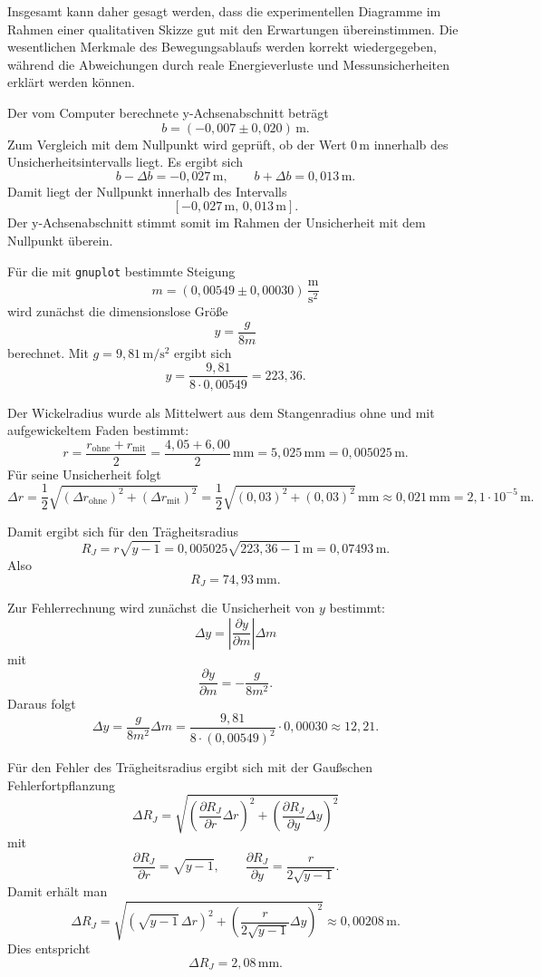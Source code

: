 \documentclass{report}
\begin{document}
\noindent
Insgesamt kann daher gesagt werden, dass die experimentellen Diagramme im Rahmen einer qualitativen Skizze gut mit den Erwartungen übereinstimmen. Die wesentlichen Merkmale des Bewegungsablaufs werden korrekt wiedergegeben, während die Abweichungen durch reale Energieverluste und Messunsicherheiten erklärt werden können.

\bigskip

\noindent
Der vom Computer berechnete y-Achsenabschnitt beträgt
\[
b = (-0{,}007 \pm 0{,}020)\,\mathrm{m}.
\]
Zum Vergleich mit dem Nullpunkt wird geprüft, ob der Wert \(0\,\mathrm{m}\) innerhalb des Unsicherheitsintervalls liegt. Es ergibt sich
\[
b-\Delta b = -0{,}027\,\mathrm{m},
\qquad
b+\Delta b = 0{,}013\,\mathrm{m}.
\]
Damit liegt der Nullpunkt innerhalb des Intervalls
\[
[-0{,}027\,\mathrm{m},\,0{,}013\,\mathrm{m}].
\]
Der y-Achsenabschnitt stimmt somit im Rahmen der Unsicherheit mit dem Nullpunkt überein.


\bigskip

\noindent
Für die mit \texttt{gnuplot} bestimmte Steigung
\[
m=(0{,}00549\pm0{,}00030)\,\mathrm{\frac{m}{s^2}}
\]
wird zunächst die dimensionslose Größe
\[
y=\frac{g}{8m}
\]
berechnet. Mit \(g=9{,}81\,\mathrm{m/s^2}\) ergibt sich
\[
y=\frac{9{,}81}{8\cdot0{,}00549}=223{,}36.
\]

\noindent
Der Wickelradius wurde als Mittelwert aus dem Stangenradius ohne und mit aufgewickeltem Faden bestimmt:
\[
r=\frac{r_{\text{ohne}}+r_{\text{mit}}}{2}
=\frac{4{,}05+6{,}00}{2}\,\mathrm{mm}
=5{,}025\,\mathrm{mm}
=0{,}005025\,\mathrm{m}.
\]
Für seine Unsicherheit folgt
\[
\Delta r=\frac12\sqrt{(\Delta r_{\text{ohne}})^2+(\Delta r_{\text{mit}})^2}
=\frac12\sqrt{(0{,}03)^2+(0{,}03)^2}\,\mathrm{mm}
\approx0{,}021\,\mathrm{mm}
=2{,}1\cdot10^{-5}\,\mathrm{m}.
\]

\noindent
Damit ergibt sich für den Trägheitsradius
\[
R_J=r\sqrt{y-1}
=0{,}005025\sqrt{223{,}36-1}\,\mathrm{m}
=0{,}07493\,\mathrm{m}.
\]
Also
\[
R_J=74{,}93\,\mathrm{mm}.
\]

\noindent
Zur Fehlerrechnung wird zunächst die Unsicherheit von \(y\) bestimmt:
\[
\Delta y=\left|\frac{\partial y}{\partial m}\right|\Delta m
\]
mit
\[
\frac{\partial y}{\partial m}=-\frac{g}{8m^2}.
\]
Daraus folgt
\[
\Delta y=\frac{g}{8m^2}\Delta m
=\frac{9{,}81}{8\cdot(0{,}00549)^2}\cdot0{,}00030
\approx12{,}21.
\]

\noindent
Für den Fehler des Trägheitsradius ergibt sich mit der Gaußschen Fehlerfortpflanzung
\[
\Delta R_J=
\sqrt{
\left(\frac{\partial R_J}{\partial r}\Delta r\right)^2+
\left(\frac{\partial R_J}{\partial y}\Delta y\right)^2
}
\]
mit
\[
\frac{\partial R_J}{\partial r}=\sqrt{y-1},
\qquad
\frac{\partial R_J}{\partial y}=\frac{r}{2\sqrt{y-1}}.
\]
Damit erhält man
\[
\Delta R_J=
\sqrt{
\left(\sqrt{y-1}\,\Delta r\right)^2+
\left(\frac{r}{2\sqrt{y-1}}\Delta y\right)^2
}
\approx0{,}00208\,\mathrm{m}.
\]
Dies entspricht
\[
\Delta R_J=2{,}08\,\mathrm{mm}.
\]
\end{document}
